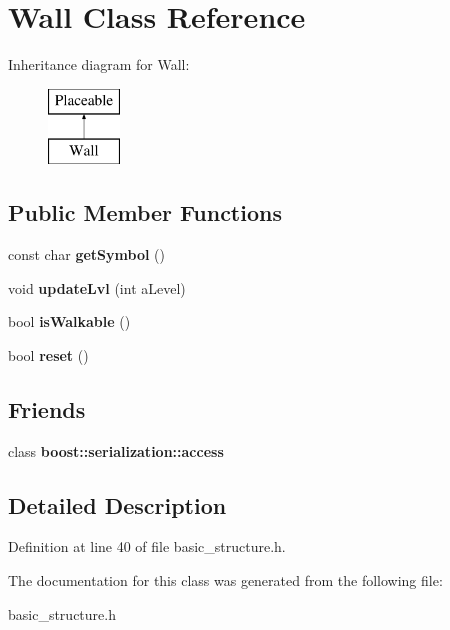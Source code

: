 \hypertarget{class_wall}{}\section{Wall Class Reference}
\label{class_wall}
Inheritance diagram for Wall\+:\begin{figure}[H]
\begin{center}
\leavevmode
\includegraphics[height=2.000000cm]{class_wall}
\end{center}
\end{figure}
\subsection*{Public Member Functions}
\begin{DoxyCompactItemize}
\item 
\hypertarget{class_wall_a0c87e6f71e807e46721712b75d7fe5ad}{}\label{class_wall_a0c87e6f71e807e46721712b75d7fe5ad} 
const char {\bfseries get\+Symbol} ()
\item 
\hypertarget{class_wall_a115c65e30af750fdf1c74392495bac4c}{}\label{class_wall_a115c65e30af750fdf1c74392495bac4c} 
void {\bfseries update\+Lvl} (int a\+Level)
\item 
\hypertarget{class_wall_ab7b0b368cae9727d00125ba37381206a}{}\label{class_wall_ab7b0b368cae9727d00125ba37381206a} 
bool {\bfseries is\+Walkable} ()
\item 
\hypertarget{class_wall_a6320565e6c2d93e2cc1e2aa400d27401}{}\label{class_wall_a6320565e6c2d93e2cc1e2aa400d27401} 
bool {\bfseries reset} ()
\end{DoxyCompactItemize}
\subsection*{Friends}
\begin{DoxyCompactItemize}
\item 
\hypertarget{class_wall_ac98d07dd8f7b70e16ccb9a01abf56b9c}{}\label{class_wall_ac98d07dd8f7b70e16ccb9a01abf56b9c} 
class {\bfseries boost\+::serialization\+::access}
\end{DoxyCompactItemize}


\subsection{Detailed Description}


Definition at line 40 of file basic\+\_\+structure.\+h.



The documentation for this class was generated from the following file\+:\begin{DoxyCompactItemize}
\item 
basic\+\_\+structure.\+h\end{DoxyCompactItemize}
